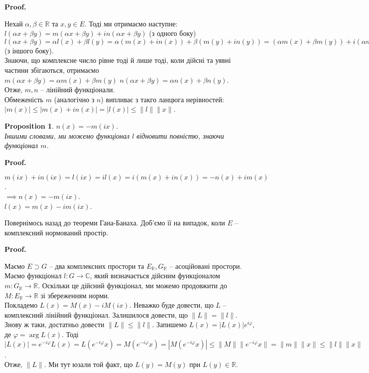 \documentclass[a4paper, 10pt]{article}
\makeatletter
\theoremstyle{theoremdd}
\theoremstyle{theoremdd}
\theoremstyle{theoremdd}
\theoremstyle{theoremdd}
\theoremstyle{theoremdd}
\newtheorem{proposition}[theorem]{Proposition}
\theoremstyle{theoremdd}
\theoremstyle{theoremdd}
\theoremstyle{theoremdd}
\renewenvironment{proof}[1][Proof.\\]{\par
\pushQED{\hfill \qed}%
\normalfont \topsep6\p@\@plus6\p@\relax
\trivlist
\item\relax
{\bfseries
#1\@addpunct{.}}\hspace\labelsep\ignorespaces
}{%
\popQED\endtrivlist\@endpefalse
}
\makeatother
\begin{document}
\begin{proof}
Нехай $\alpha,\beta \in \mathbb{R}$ та $x,y \in E$. Тоді ми отримаємо наступне:\\
$l(\alpha x + \beta y) = m(\alpha x + \beta y) + i n(\alpha x + \beta y)$ (з одного боку)\\
$l(\alpha x + \beta y) = \alpha l(x) + \beta l(y) = \alpha (m(x) + i n(x)) + \beta (m(y) + i n(y)) = (\alpha m(x) + \beta m(y)) + i(\alpha n(x) + \beta n(y))$ (з іншого боку).\\
Знаючи, що комплексне число рівне тоді й лише тоді, коли дійсні та уявні частини збігаються, отримаємо\\
$m(\alpha x + \beta y) = \alpha m(x) + \beta m(y)$ \qquad $n(\alpha x + \beta y) = \alpha n(x) + \beta n(y)$.\\
Отже, $m,n$ -- лінійний функціонали.\\
Обмеженість $m$ (аналогічно з $n$) випливає з такго ланцюга нерівностей:\\
$|m(x)| \leq |m(x) + in(x)| = |l(x)| \leq \|l\| \|x\|$.
\end{proof}

\begin{proposition}
$n(x) = -m(ix)$.\\
Іншими словами, ми можемо функціонал $l$ відновити повністю, знаючи функціонал $m$.
\end{proposition}

\begin{proof}
$m(ix) + in(ix) = l(ix) = i l(x) = i(m(x) + in(x)) = -n(x) + im(x)$.\\
$\implies n(x) = -m(ix)$.\\
$l(x) = m(x) -im(ix)$.
\end{proof}

Повернімось назад до теореми Гана-Банаха. Доб'ємо її на випадок, коли $E$ -- комплексний нормований простір.
\begin{proof}
Маємо $E \supset G$ -- два комплексних простори та $E_{\mathbb{R}}, G_{\mathbb{R}}$ -- асоційовані простори. Маємо функціонал $l \colon G \to \mathbb{C}$, який визначається дійсним функціоналом $m \colon G_{\mathbb{R}} \to \mathbb{R}$. Оскільки це дійсний функціонал, ми можемо продовжити до $M \colon E_{\mathbb{R}} \to \mathbb{R}$ зі збереженням норми.\\
Покладемо $L(x) = M(x) - i M(ix)$. Неважко буде довести, що $L$ -- комплексний лінійний функціонал. Залишилося довести, що $\|L\| = \|l\|$. Знову ж таки, достатньо довести $\|L\| \leq \|l\|$. Запишемо $L(x) = |L(x)|e^{i \varphi}$, де $\varphi = \arg L(x)$. Тоді\\
$|L(x)| = e^{-i \varphi} L(x) = L(e^{-i \varphi} x) = M(e^{-i \varphi} x) = |M(e^{-i \varphi}x)| \leq \|M\| \|e^{-i \varphi} x\| = \|m\| \|x\| \leq \|l\| \|x\|$.\\
Отже, $\|L\|$. Ми тут юзали той факт, що $L(y) = M(y)$ при $L(y) \in \mathbb{R}$.
\end{proof}
\end{document}
